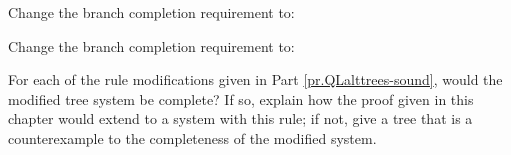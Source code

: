 \begin{earg}
\item Change the branch completion requirement to:

\item Change the branch completion requirement to:
	
	\end{earg}
	
	
	
	
\solutions
\problempart
\label{pr.QLalttrees-complete}
For each of the rule modifications given in Part \ref{pr.QLalttrees-sound}, would the modified tree system be complete? If so, explain how the proof given in this chapter would extend to a system with this rule; if not, give a tree that is a counterexample to the completeness of the modified system.

\fi

